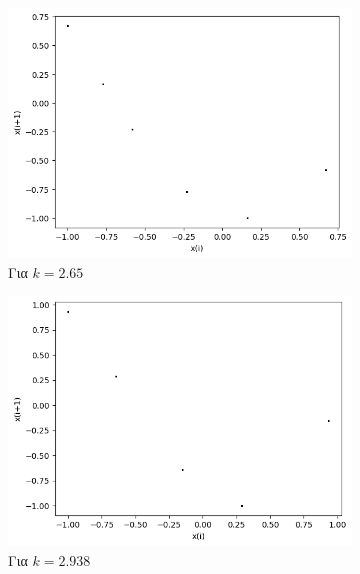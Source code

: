 \begin{figure}[ht]
	\centering
	\begin{subfigure}[b]{0.4\textwidth}
		\centering
		\includegraphics[width=\textwidth]{LateX images/cheb q=0.8/g6}
		\caption{Για $k=2.65$}
		\label{f:k133}
	\end{subfigure}
	\hfill
	\begin{subfigure}[b]{0.4\textwidth}
		\centering
		\includegraphics[width=\textwidth]{LateX images/cheb q=0.8/g7}
		\caption{Για $k=2.938$}
		\label{f:k134}
	\end{subfigure}
	\hfill
	\begin{subfigure}[b]{0.4\textwidth}
		\centering

\end{subfigure}
\end{figure}
